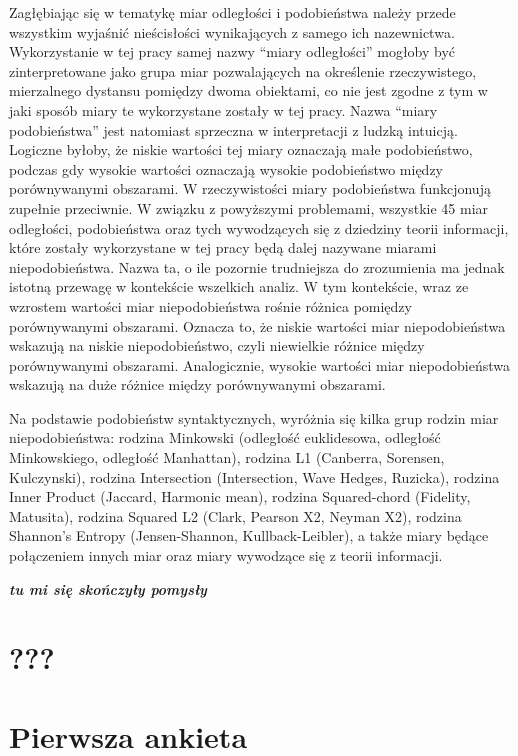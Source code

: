 \documentclass{amuthesis}
\begin{document}
Zagłębiając się w tematykę miar odległości i podobieństwa należy przede
wszystkim wyjaśnić nieścisłości wynikających z samego ich nazewnictwa.
Wykorzystanie w tej pracy samej nazwy ``miary odległości'' mogłoby być
zinterpretowane jako grupa miar pozwalających na określenie
rzeczywistego, mierzalnego dystansu pomiędzy dwoma obiektami, co nie
jest zgodne z tym w jaki sposób miary te wykorzystane zostały w tej
pracy. Nazwa ``miary podobieństwa'' jest natomiast sprzeczna w
interpretacji z ludzką intuicją. Logiczne byłoby, że niskie wartości tej
miary oznaczają małe podobieństwo, podczas gdy wysokie wartości
oznaczają wysokie podobieństwo między porównywanymi obszarami. W
rzeczywistości miary podobieństwa funkcjonują zupełnie przeciwnie. W
związku z powyższymi problemami, wszystkie 45 miar odległości,
podobieństwa oraz tych wywodzących się z dziedziny teorii informacji,
które zostały wykorzystane w tej pracy będą dalej nazywane miarami
niepodobieństwa. Nazwa ta, o ile pozornie trudniejsza do zrozumienia ma
jednak istotną przewagę w kontekście wszelkich analiz. W tym kontekście,
wraz ze wzrostem wartości miar niepodobieństwa rośnie różnica pomiędzy
porównywanymi obszarami. Oznacza to, że niskie wartości miar
niepodobieństwa wskazują na niskie niepodobieństwo, czyli niewielkie
różnice między porównywanymi obszarami. Analogicznie, wysokie wartości
miar niepodobieństwa wskazują na duże różnice między porównywanymi
obszarami.

Na podstawie podobieństw syntaktycznych, wyróżnia się kilka grup rodzin
miar niepodobieństwa: rodzina Minkowski (odległość euklidesowa,
odległość Minkowskiego, odległość Manhattan), rodzina L1 (Canberra,
Sorensen, Kulczynski), rodzina Intersection (Intersection, Wave Hedges,
Ruzicka), rodzina Inner Product (Jaccard, Harmonic mean), rodzina
Squared-chord (Fidelity, Matusita), rodzina Squared L2 (Clark, Pearson
X2, Neyman X2), rodzina Shannon's Entropy (Jensen-Shannon,
Kullback-Leibler), a także miary będące połączeniem innych miar oraz
miary wywodzące się z teorii informacji.

\textbf{\emph{tu mi się skończyły pomysły}}


\hypertarget{sec-materialy}{%
\chapter{???}\label{sec-materialy}}


\hypertarget{sec-wyniki1}{%
\chapter{Pierwsza ankieta}\label{sec-wyniki1}}
\end{document}
